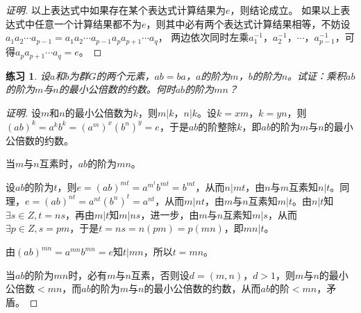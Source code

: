 \documentclass{article}
\newtheorem{Exercise}{练习}
\begin{document}
\begin{CJK*}{UTF8}{gbsn}
\begin{proof}[证明]
  以上表达式中如果存在某个表达式计算结果为$e$，则结论成立。
如果以上表达式中任意一个计算结果都不为$e$，则其中必有两个表达式计算结果相等，不妨设$a_1a_2\cdots a_{p-1} = a_1a_2\cdots a_{p-1}a_p a_{p+1}\cdots a_q$，
两边依次同时左乘$a_1^{-1}$，$a_2^{-1}$，$\cdots$，$a_{p-1}^{-1}$，可得$a_pa_{p+1}\cdots a_q=e$。

\end{proof}
\begin{Exercise}
  设$a$和$b$为群$G$的两个元素，$ab=ba$，$a$的阶为$m$，$b$的阶为$n$。试证：乘积$ab$的阶为$m$与$n$的最小公倍数的约数。何时$ab$的阶为$mn$？
\end{Exercise}
\begin{proof}[证明]
  设$m$和$n$的最小公倍数为$k$，则$m|k$，$n|k$。设$k=xm$，$k=yn$，则$(ab)^k=a^kb^k=(a^m)^x(b^n)^y=e$，于是$ab$的阶整除$k$，即$ab$的阶为$m$与$n$的最小公倍数的约数。

  当$m$与$n$互素时，$ab$的阶为$mn$。


  设$ab$的阶为$t$，则$e=(ab)^{mt}=a^m^tb^{mt}=b^{mt}$，从而$n|mt$，由$n$与$m$互素知$n|t$。同理，$e=(ab)^{nt}=a^{nt}(b^n)^t=a^{nt}$，从而$m|nt$，由$m$与$n$互素知$m|t$。由$n|t$知$\exists s\in Z,t=ns$，再由$m|t$知$m|ns$，进一步，由$m$与$n$互素知$m|s$，从而$\exists p\in Z,s=pm$，于是$t=ns=n(pm)=p(mn)$，即$mn|t$。

  由$(ab)^{mn}=a^{mn}b^{mn}=e$知$t|mn$，所以$t=mn$。

  当$ab$的阶为$mn$时，必有$m$与$n$互素，否则设$d=(m,n)$，$d>1$，则$m$与$n$的最小公倍数$<mn$，而$ab$的阶为$m$与$n$的最小公倍数的约数，从而$ab$的阶$<mn$，矛盾。
\end{proof}
\end{CJK*}
\end{document}
